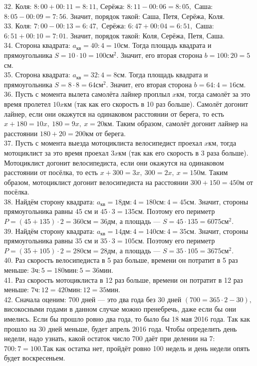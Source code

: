 \documentclass[12pt]{article}
\begin{document}
32. Коля: $8:00+00:11=8:11$, Серёжа: $8:11-00:06=8:05,$ Саша: $8:05-00:09=7:56.$ Значит, порядок такой: Саша, Петя, Серёжа, Коля.\\
33. Коля: $7:00-00:13=6:47,$ Серёжа: $6:47+00:04=6:51,$ Саша: $6:51+00:10=7:01.$ Значит, порядок такой: Коля, Серёжа, Петя, Саша.\\
34. Сторона квадрата: $a_{\text{кв}}=40:4=10$см. Тогда площадь квадрата и прямоугольника $S=10\cdot10=100\text{см}^2.$ Значит, его вторая сторона $b=100:20=5$см.\\
35. Сторона квадрата: $a_{\text{кв}}=32:4=8$см. Тогда площадь квадрата и прямоугольника $S=8\cdot8=64\text{см}^2.$ Значит, его вторая сторона $b=64:4=16$см.\\
36. Пусть с момента вылета самолёта лайнер проплыл $x$км, тогда самолёт за это время пролетел $10x$км (так как его скорость в 10 раз больше). Самолёт догонит лайнер, если они окажутся на одинаковом расстоянии от берега, то есть $x+180=10x,\ 180=9x,\ x=20$км. Таким образом, самолёт догонит лайнер на расстоянии $180+20=200$км от берега.\\
37. Пусть с момента выезда мотоциклиста велосипедист проехал $x$км, тогда мотоциклист за это время проехал $3x$км (так как его скорость в 3 раза больше). Мотоциклист догонит велосипедиста, если они окажутся на одинаковом расстоянии от посёлка, то есть $x+300=3x,\ 300=2x,\ x=150$м. Таким образом, мотоциклист догонит велосипедиста на расстоянии $300+150=450$м от посёлка.\\
38. Найдём сторону квадрата: $a_{\text{кв}}=18\text{дм}:4=180\text{см}:4=45$см. Значит, стороны прямоугольника равны $45$ см и $45\cdot3=135$см. Поэтому его периметр $P=(45+135)\cdot2=360\text{см}=36$дм, а площадь --- $S=45\cdot135=6075\text{см}^2.$\\
39. Найдём сторону квадрата: $a_{\text{кв}}=14\text{дм}:4=140\text{см}:4=35$см. Значит, стороны прямоугольника равны $35$ см и $35\cdot3=105$см. Поэтому его периметр $P=(35+105)\cdot2=280\text{см}=28$дм, а площадь --- $S=35\cdot105=3675\text{см}^2.$\\
40. Раз скорость велосипедиста в 5 раз больше, времени он потратит в 5 раз меньше: $3\text{ч}:5=180\text{мин}:5=36$мин.\\
41. Раз скорость мотоциклиста в 12 раз больше, времени он потратит в 12 раз меньше: $7\text{ч}:12=420\text{мин}:12=35$мин.\\
42. Сначала оценим: 700 дней --- это два года без 30 дней $(700=365\cdot2-30),$ високосными годами в данном случае можно пренебречь, даже если бы они имелись. Если бы прошло ровно два года, то было бы 18 мая 2016 года. Так как прошло на 30 дней меньше, будет апрель 2016 года. Чтобы определить день недели, надо узнать, какой остаток число 700 даёт при делении на 7: $700:7=100.$Так как остатка нет, пройдёт ровно 100 недель и день недели опять будет воскресеньем.\\
\end{document}
